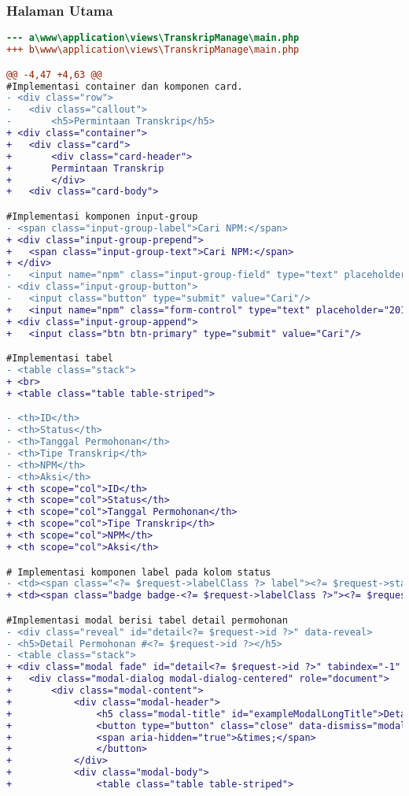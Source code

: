 \subsubsection{Halaman Utama}
\begin{lstlisting}[language=diff, caption=Perubahan file \path{\views\TranskripManage\main.php},  basicstyle=\ttfamily, frame=single,
columns=fullflexible, keepspaces=true, breaklines=true, label={lst:mainTranskripManage}]
--- a\www\application\views\TranskripManage\main.php
+++ b\www\application\views\TranskripManage\main.php

@@ -4,47 +4,63 @@
#Implementasi container dan komponen card.
- <div class="row">
- 	<div class="callout">
- 		<h5>Permintaan Transkrip</h5>
+ <div class="container">
+ 	<div class="card">
+ 		<div class="card-header">
+ 		Permintaan Transkrip
+ 		</div>
+ 	<div class="card-body">

#Implementasi komponen input-group
- <span class="input-group-label">Cari NPM:</span>
+ <div class="input-group-prepend">
+ 	<span class="input-group-text">Cari NPM:</span>
+ </div>
- 	<input name="npm" class="input-group-field" type="text" placeholder="2013730013" maxlength="10" minlength="10"<?= $npmQuery === NULL ? '' : " value='$npmQuery'" ?>/>
- <div class="input-group-button">
- 	<input class="button" type="submit" value="Cari"/>
+ 	<input name="npm" class="form-control" type="text" placeholder="2013730013" maxlength="10" minlength="10"<?= $npmQuery === NULL ? '' : " value='$npmQuery'" ?>/>
+ <div class="input-group-append">
+ 	<input class="btn btn-primary" type="submit" value="Cari"/>

#Implementasi tabel
- <table class="stack">
+ <br>
+ <table class="table table-striped">

- <th>ID</th>
- <th>Status</th>
- <th>Tanggal Permohonan</th>
- <th>Tipe Transkrip</th>
- <th>NPM</th>
- <th>Aksi</th>
+ <th scope="col">ID</th>
+ <th scope="col">Status</th>
+ <th scope="col">Tanggal Permohonan</th>
+ <th scope="col">Tipe Transkrip</th>
+ <th scope="col">NPM</th>
+ <th scope="col">Aksi</th>

# Implementasi komponen label pada kolom status
- <td><span class="<?= $request->labelClass ?> label"><?= $request->status ?></span></td>
+ <td><span class="badge badge-<?= $request->labelClass ?>"><?= $request->status ?></span></td>

#Implementasi modal berisi tabel detail permohonan
- <div class="reveal" id="detail<?= $request->id ?>" data-reveal>
- <h5>Detail Permohonan #<?= $request->id ?></h5>
- <table class="stack">
+ <div class="modal fade" id="detail<?= $request->id ?>" tabindex="-1" role="dialog" aria-hidden="true">
+ 	<div class="modal-dialog modal-dialog-centered" role="document">
+ 		<div class="modal-content">
+ 			<div class="modal-header">
+ 				<h5 class="modal-title" id="exampleModalLongTitle">Detail Permohonan #<?= $request->id ?></h5>
+ 				<button type="button" class="close" data-dismiss="modal" aria-label="Close">
+ 				<span aria-hidden="true">&times;</span>
+ 				</button>
+ 			</div>
+ 			<div class="modal-body">
+ 				<table class="table table-striped">


\end{lstlisting}
